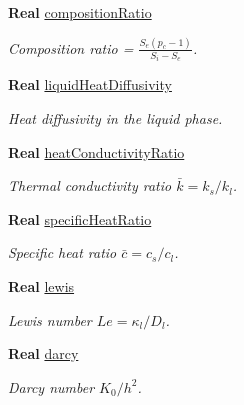 \begin{DoxyCompactItemize}
\textbf{ Real} \hyperlink{class_mushy_layer_params_ac97e799b81db331d775928ab31c9080e}{composition\+Ratio}
\begin{DoxyCompactList}\small\item\em Composition ratio = $ \frac{S_e (p_c - 1)}{S_i -S_e} $. \end{DoxyCompactList}\item 
\mbox{\label{class_mushy_layer_params_a7ebd7811b912361059bb8fcde091dec3}} 
\textbf{ Real} \hyperlink{class_mushy_layer_params_a7ebd7811b912361059bb8fcde091dec3}{liquid\+Heat\+Diffusivity}
\begin{DoxyCompactList}\small\item\em Heat diffusivity in the liquid phase. \end{DoxyCompactList}\item 
\mbox{\label{class_mushy_layer_params_aca0e7fca4cf6ab1fca77d8ff63045125}} 
\textbf{ Real} \hyperlink{class_mushy_layer_params_aca0e7fca4cf6ab1fca77d8ff63045125}{heat\+Conductivity\+Ratio}
\begin{DoxyCompactList}\small\item\em Thermal conductivity ratio $ \bar{k} = k_s/k_l $. \end{DoxyCompactList}\item 
\mbox{\label{class_mushy_layer_params_ae74a860e74c94a9592de44ad52139ffa}} 
\textbf{ Real} \hyperlink{class_mushy_layer_params_ae74a860e74c94a9592de44ad52139ffa}{specific\+Heat\+Ratio}
\begin{DoxyCompactList}\small\item\em Specific heat ratio $ \bar{c} = c_s/c_l $. \end{DoxyCompactList}\item 
\mbox{\label{class_mushy_layer_params_add4a51dbf21185fb7172b52d54425cb5}} 
\textbf{ Real} \hyperlink{class_mushy_layer_params_add4a51dbf21185fb7172b52d54425cb5}{lewis}
\begin{DoxyCompactList}\small\item\em Lewis number $ Le = \kappa_l/D_l $. \end{DoxyCompactList}\item 
\textbf{ Real} \hyperlink{class_mushy_layer_params_a1cc8074618d57c994ce1771cba4a973c}{darcy}
\begin{DoxyCompactList}\small\item\em Darcy number $ K_0/h^2 $. \end{DoxyCompactList}\item 

\end{DoxyCompactItemize}
